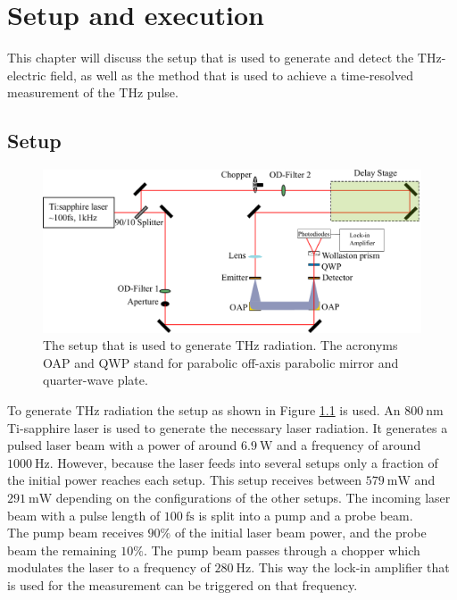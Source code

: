\chapter{Setup and execution}
This chapter will discuss the setup that is used to generate and detect the $\si{\tera\hertz}$-electric field, as well as the method that is used to achieve a time-resolved measurement of the $\si{\tera\hertz}$ pulse.

\section{Setup}
\label{sec:setup}
\begin{figure}
    \centering
    \includegraphics[width=\textwidth]{Plots/Aufbau.pdf}
    \caption{The setup that is used to generate $\si{\tera\hertz}$ radiation.
    The acronyms OAP and QWP stand for parabolic off-axis parabolic mirror and quarter-wave plate. }
    \label{fig:setup}
\end{figure}
To generate $\si{\tera\hertz}$ radiation the setup as shown in Figure \ref{fig:setup} is used.
An $\SI{800}{\nano\meter}$ Ti-sapphire laser is used to generate the necessary laser radiation.
It generates a pulsed laser beam with a power of around $\SI{6.9}{\W}$ and a frequency of around $\SI{1000}{\Hz}$.
However, because the laser feeds into several setups only a fraction of the initial power reaches each setup.
This setup receives between $\SI{579}{\milli\W}$ and $\SI{291}{\milli\W}$ depending on the configurations of the other setups. 
The incoming laser beam with a pulse length of $\SI{100}{\femto\second}$ is split into a pump and a probe beam.
\\
The pump beam receives $90\%$ of the initial laser beam power, and the probe beam the remaining $10\%$.
The pump beam passes through a chopper which modulates the laser to a frequency of $\SI{280}{\hertz}$.
This way the lock-in amplifier that is used for the measurement can be triggered on that frequency.
